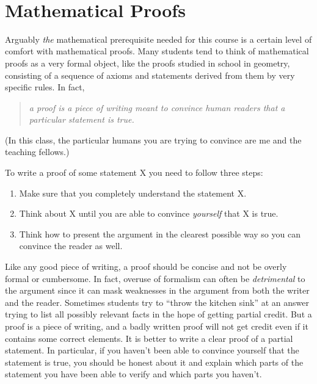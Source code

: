 ~

\section{Mathematical Proofs}\label{Mathematical-Proofs}

Arguably \emph{the} mathematical prerequisite needed for this course is
a certain level of comfort with mathematical proofs. Many students tend
to think of mathematical proofs as a very formal object, like the proofs
studied in school in geometry, consisting of a sequence of axioms and
statements derived from them by very specific rules. In fact,

\begin{quote}
\emph{a proof is a piece of writing meant to convince human readers that
a particular statement is true.}
\end{quote}

(In this class, the particular humans you are trying to convince are me
and the teaching fellows.)

To write a proof of some statement X you need to follow three steps:

\begin{enumerate}
\def\labelenumi{\arabic{enumi}.}
\item
  Make sure that you completely understand the statement X.
\item
  Think about X until you are able to convince \emph{yourself} that X is
  true.
\item
  Think how to present the argument in the clearest possible way so you
  can convince the reader as well.
\end{enumerate}

Like any good piece of writing, a proof should be concise and not be
overly formal or cumbersome. In fact, overuse of formalism can often be
\emph{detrimental} to the argument since it can mask weaknesses in the
argument from both the writer and the reader. Sometimes students try to
``throw the kitchen sink'' at an answer trying to list all possibly
relevant facts in the hope of getting partial credit. But a proof is a
piece of writing, and a badly written proof will not get credit even if
it contains some correct elements. It is better to write a clear proof
of a partial statement. In particular, if you haven't been able to
convince yourself that the statement is true, you should be honest about
it and explain which parts of the statement you have been able to verify
and which parts you haven't.

